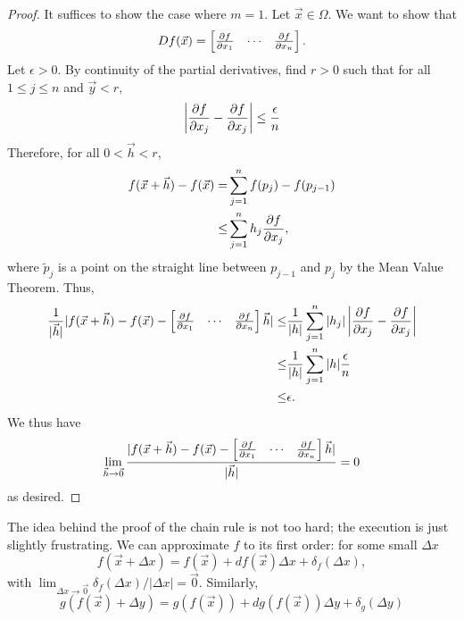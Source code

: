 \begin{proof}
It suffices to show the case where $m=1$. Let $\vec{x}\in \Omega$. We want to show that \[
Df(\vec{x}) = \begin{bmatrix}
    \pdv{f}{x_1}(\vec{x}) & \cdots & \pdv{f}{x_n}(\vec{x})
\end{bmatrix}.
\]
Let $\epsilon>0$. By continuity of the partial derivatives, find $r>0$ such that for all $1\leq j\leq n$ and $\vec{y}< r,$\[
    \left|\pdv{f}{x_j}(\vec{x}) -\pdv{f}{x_j}(\vec{x}+\vec{y}) \right| \leq \frac{\epsilon}{n}
\]
Therefore, for all $0<\vec{h}< r$,\begin{align*}
    f(\vec{x}+\vec{h}) - f(\vec{x})= & \sum_{j=1}^n f(p_j)-f(p_{j-1})\\
        \leq&\sum_{j=1}^n h_j \pdv{f}{x_j}(\tilde{p}_j),
\end{align*}
where $\tilde{p}_j$ is a point on the straight line between $p_{j-1}$ and $p_j$ by the Mean Value Theorem. Thus, 
\begin{align*}
    \frac{1}{|\vec{h}|}| f(\vec{x}+\vec{h}) - f(\vec{x}) -\begin{bmatrix}
        \pdv{f}{x_1}(\vec{x}) & \cdots & \pdv{f}{x_n}(\vec{x})
    \end{bmatrix}\vec{h}| \leq & \frac{1}{|h|}\sum_{j=1}^n |h_j| \left|\pdv{f}{x_j}(\tilde{p}_j)-
    \pdv{f}{x_j}(\vec{x})\right|\\
    \leq &\frac{1}{|h|}\sum_{j=1}^n |h| \frac{\epsilon}{n} \\
    \leq &\epsilon.
\end{align*}
We thus have \[
\lim_{\vec{h}\to\vec{0}}\frac{|f(\vec{x}+\vec{h}) - f(\vec{x}) -\begin{bmatrix}
    \pdv{f}{x_1}(\vec{x}) & \cdots & \pdv{f}{x_n}(\vec{x})
\end{bmatrix}\vec{h}|}{|\vec{h}|} = 0
\]
as desired.
\end{proof}
The idea behind the proof of the chain rule is not too hard; the execution is just slightly frustrating. 
We can approximate $f$ to its first order: for some small $\Delta x$ \[
    f(\vec{x}+\Delta x)  = f(\vec{x}) + df(\vec{x}) \Delta x + \delta_f(\Delta x),
\]
with $\lim_{\Delta x\to \vec{0}} \delta_f(\Delta x) / |\Delta x| = \vec{0} $. Similarly, \[
   g( f(\vec{x})+\Delta y)  = g(f(\vec{x})) + dg(f(\vec{x})) \Delta y + \delta_g(\Delta y)
\]
